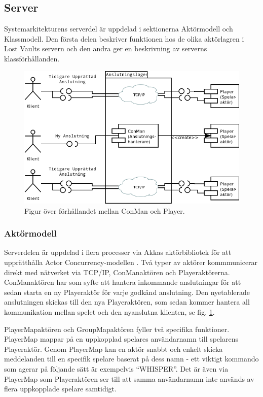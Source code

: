 \documentclass[a4paper]{article}
\begin{document}
\subsection{Server}
Systemarkitekturens serverdel är uppdelad i sektionerna Aktörmodell och Klassmodell. Den första delen beskriver funktionen hos de olika aktörlagren i Lost Vaults servern och den andra ger en  beskrivning av serverns klassförhållanden.

\begin{figure}[hbt]
\centering
\includegraphics[width=1.0\textwidth]{serverActorModel2-1}
\caption{\label{fig:ConManPlayer}Figur över förhållandet mellan ConMan och Player.}
\end{figure}

\subsubsection{Aktörmodell}
Serverdelen är uppdelad i flera processer via Akkas aktörbibliotek för att upprätthålla Actor Concurrency-modellen .
Två typer av aktörer kommmunicerar direkt med nätverket via TCP/IP, ConManaktören och Playeraktörerna. ConManaktören har som syfte att hantera inkommande anslutningar för att sedan starta en ny Playeraktör för varje godkänd anslutning. Den nyetablerade anslutningen skickas till den nya Playeraktören, som sedan kommer hantera all kommunikation mellan spelet och den nyanslutna klienten, se fig. \ref{fig:ConManPlayer}.   

PlayerMapaktören och GroupMapaktören fyller två specifika funktioner. PlayerMap mappar på en uppkopplad spelares användarnamn till spelarens Playeraktör. Genom PlayerMap kan en aktör snabbt och enkelt skicka meddelanden till en specifik spelare baserat på dess namn - ett viktigt kommando som agerar på följande sätt är exempelvis “WHISPER”. Det är även via PlayerMap som Playeraktören ser till att samma användarnamn inte används av flera uppkopplade spelare samtidigt. 
\end{document}
